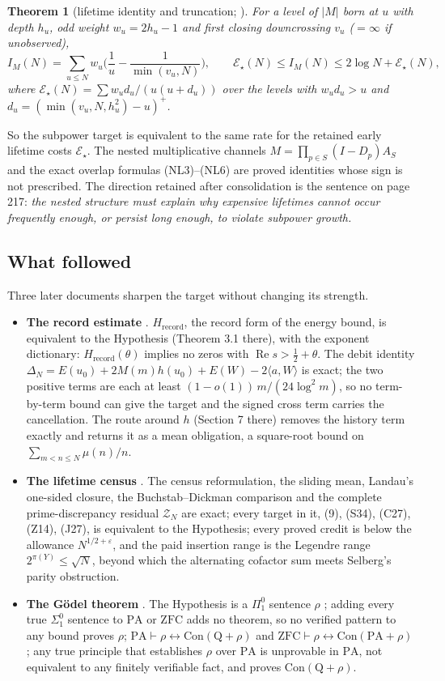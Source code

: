 \documentclass[11pt]{article}
\newtheorem{theorem}{Theorem}[section]
\theoremstyle{definition}
\theoremstyle{remark}
\newcommand{\PA}{\mathrm{PA}}
\newcommand{\ZFC}{\mathrm{ZFC}}
\newcommand{\Con}{\mathrm{Con}}
\newcommand{\Hrec}{H_{\mathrm{record}}}
\newcommand{\Ree}{\operatorname{Re}}
\begin{document}
\begin{theorem}[lifetime identity and truncation; {\cite[Part XVII, (NL1)--(NL2)]{running}}]\label{thm:lifetime}
For a level of $|M|$ born at $u$ with depth $h_u$, odd weight $w_u=2h_u-1$ and first closing downcrossing $v_u$ ($=\infty$ if unobserved),
\[
I_M(N)=\sum_{u\le N}w_u\Big(\frac1u-\frac1{\min(v_u,N)}\Big),\qquad
\mathcal E_\star(N)\le I_M(N)\le 2\log N+\mathcal E_\star(N),
\]
where $\mathcal E_\star(N)=\sum w_ud_u/(u(u+d_u))$ over the levels with $w_ud_u>u$ and $d_u=(\min(v_u,N,h_u^2)-u)^+$.
\end{theorem}
So the subpower target is equivalent to the same rate for the retained early lifetime costs $\mathcal E_\star$. The nested multiplicative channels $M=\prod_{p\in S}(I-D_p)A_S$ and the exact overlap formulas (NL3)--(NL6) are proved identities whose sign is not prescribed. The direction retained after consolidation is the sentence on page 217: \emph{the nested structure must explain why expensive lifetimes cannot occur frequently enough, or persist long enough, to violate subpower growth.}

\subsection{What followed}
Three later documents sharpen the target without changing its strength.
\begin{itemize}
\item \textbf{The record estimate} \cite{hrec}. $\Hrec$, the record form of the energy bound, is equivalent to the Hypothesis (Theorem 3.1 there), with the exponent dictionary: $\Hrec(\theta)$ implies no zeros with $\Ree s>\tfrac12+\theta$. The debit identity $\Delta_N=E(u_0)+2M(m)h(u_0)+E(W)-2\langle a,W\rangle$ is exact; the two positive terms are each at least $(1-o(1))\,m/(24\log^2m)$, so no term-by-term bound can give the target and the signed cross term carries the cancellation. The route around $h$ (Section 7 there) removes the history term exactly and returns it as a mean obligation, a square-root bound on $\sum_{m<n\le N}\mu(n)/n$.
\item \textbf{The lifetime census} \cite{census,censusaudit}. The census reformulation, the sliding mean, Landau's one-sided closure, the Buchstab--Dickman comparison and the complete prime-discrepancy residual $\mathcal Z_N$ are exact; every target in it, (9), (S34), (C27), (Z14), (J27), is equivalent to the Hypothesis; every proved credit is below the allowance $N^{1/2+\varepsilon}$, and the paid insertion range is the Legendre range $2^{\pi(Y)}\le\sqrt N$, beyond which the alternating cofactor sum meets Selberg's parity obstruction.
\item \textbf{The Gödel theorem} \cite{gstring}. The Hypothesis is a $\Pi^0_1$ sentence $\rho$ \cite{dmr}; adding every true $\Sigma^0_1$ sentence to $\PA$ or $\ZFC$ adds no theorem, so no verified pattern to any bound proves $\rho$; $\PA\vdash\rho\leftrightarrow\Con(\mathrm Q+\rho)$ and $\ZFC\vdash\rho\leftrightarrow\Con(\PA+\rho)$; any true principle that establishes $\rho$ over $\PA$ is unprovable in $\PA$, not equivalent to any finitely verifiable fact, and proves $\Con(\mathrm Q+\rho)$.
\end{itemize}
\end{document}
